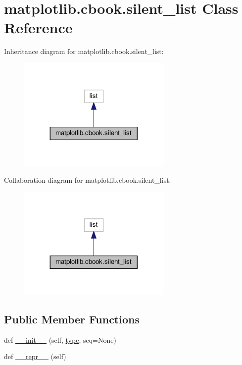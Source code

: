 \hypertarget{classmatplotlib_1_1cbook_1_1silent__list}{}\section{matplotlib.\+cbook.\+silent\+\_\+list Class Reference}
\label{classmatplotlib_1_1cbook_1_1silent__list}


Inheritance diagram for matplotlib.\+cbook.\+silent\+\_\+list\+:
\nopagebreak
\begin{figure}[H]
\begin{center}
\leavevmode
\includegraphics[width=212pt]{classmatplotlib_1_1cbook_1_1silent__list__inherit__graph}
\end{center}
\end{figure}


Collaboration diagram for matplotlib.\+cbook.\+silent\+\_\+list\+:
\nopagebreak
\begin{figure}[H]
\begin{center}
\leavevmode
\includegraphics[width=212pt]{classmatplotlib_1_1cbook_1_1silent__list__coll__graph}
\end{center}
\end{figure}
\subsection*{Public Member Functions}
\begin{DoxyCompactItemize}
\item 
def \hyperlink{classmatplotlib_1_1cbook_1_1silent__list_a79ec2cd1235a82ac33ce743cf00a9800}{\+\_\+\+\_\+init\+\_\+\+\_\+} (self, \hyperlink{classmatplotlib_1_1cbook_1_1silent__list_afca30ca07f9a02520548a53a8e2cf608}{type}, seq=None)
\item 
def \hyperlink{classmatplotlib_1_1cbook_1_1silent__list_a1b851509e318d973b5dbaf4bdd3e12d7}{\+\_\+\+\_\+repr\+\_\+\+\_\+} (self)
\end{DoxyCompactItemize}
